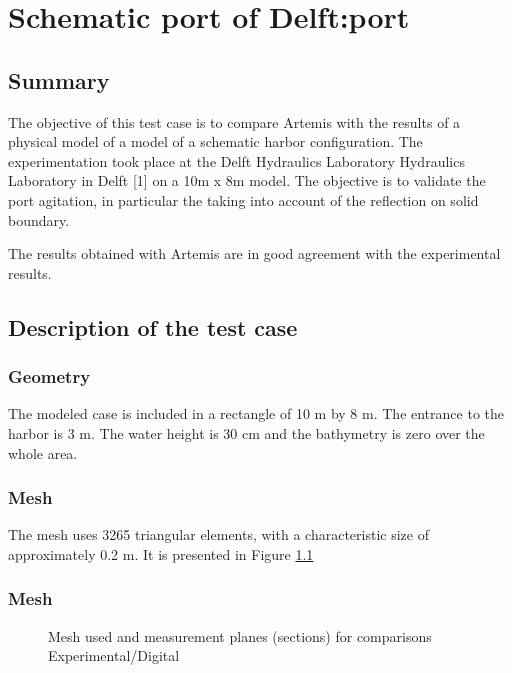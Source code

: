 \chapter{Schematic port of Delft:port}

\section{Summary}

The objective of this test case is to compare Artemis with the results of a
physical model of a model of a schematic harbor configuration. The
experimentation took place at the Delft Hydraulics Laboratory Hydraulics
Laboratory in Delft [1] on a 10m x 8m model. The objective is to validate the
port agitation, in particular the taking into account of the reflection on
solid boundary.

The results obtained with Artemis are in good agreement with the experimental
results.

\section{Description of the test case}

\subsection{Geometry}

The modeled case is included in a rectangle of 10 m by 8 m. The entrance to
the harbor is 3 m. The water height is 30 cm and the bathymetry is zero over
the whole area.

\subsection{Mesh}

The mesh uses 3265 triangular elements, with a characteristic size of approximately 0.2 m.
It is presented in Figure \ref{fig:port_mesh}


\subsection{Mesh}
\begin{figure}[h]
\begin{center}
\end{center}
\caption{ Mesh used and measurement planes (sections) for comparisons
  Experimental/Digital}
\label{fig:port_mesh}
\end{figure}

